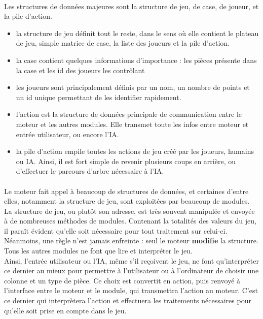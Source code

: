 \documentclass{report}
\begin{document}
        \paragraph*{}
        Les structures de données majeures sont la structure de jeu, de case, de joueur, et la pile d'action.
        \begin{itemize} %
            \item la structure de jeu définit tout le reste, dans le sens où elle contient le plateau de jeu, simple matrice de case, la liste des joueurs et la pile d'action.
            \item la case contient quelques informations d'importance : les pièces présente dans la case et les id des joueurs les contrôlant
            \item les joueurs sont principalement définis par un nom, un nombre de points et un id unique permettant de les identifier rapidement.
            \item l'action est la structure de données principale de communication entre le moteur et les autres modules. Elle transmet toute les infos entre moteur et entrée utilisateur,
                ou encore l'IA.
            \item la pile d'action empile toutes les actions de jeu créé par les joueurs, humains ou IA. Ainsi, il est fort simple de revenir plusieurs coups en arrière, 
                ou d'effectuer le parcours d'arbre nécessaire à l'IA.
        \end{itemize}
        \paragraph*{} %
        Le moteur fait appel à beaucoup de structures de données, et certaines d'entre elles, notamment la structure de jeu, sont exploitées par beaucoup de modules. \\
        La structure de jeu, ou plutôt son adresse, est très souvent manipulée et envoyée à de nombreuses méthodes de modules. Contenant la totalités des valeurs du jeu, il paraît évident
        qu'elle soit nécessaire pour tout traitement sur celui-ci. Néanmoins, une règle n'est jamais enfreinte : seul le moteur \textbf{modifie} la structure. Tous les autres modules ne
        font que lire et interpréter le jeu. \\
        Ainsi, l'entrée utilisateur ou l'IA, même s'il reçoivent le jeu, ne font qu'interpréter ce dernier au mieux pour permettre à 
        l'utilisateur ou à l'ordinateur de choisir une colonne et un type de pièce. Ce choix est convertit en action, puis renvoyé à l'interface entre le moteur et le module, 
        qui transmettra l'action au moteur. C'est ce dernier qui interprètera l'action et effectuera les traitements nécessaires pour qu'elle soit prise en compte dans le jeu. 
\end{document}

